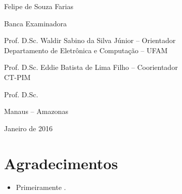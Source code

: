 





\begin{center}
{\large Felipe de Souza Farias}

\vspace*{3cm}

\tittese

\vspace*{1cm}


\vspace*{1cm}

Banca Examinadora
\vspace{2em}

Prof. D.Sc. Waldir Sabino da Silva Júnior -- Orientador\\
Departamento de Eletrônica e Computação -- UFAM
\vspace{2em}

Prof. D.Sc. Eddie Batista de Lima Filho -- Coorientador\\
CT-PIM
\vspace{2em}

Prof. D.Sc.  \\

\vspace{2em}


Manaus -- Amazonas

Janeiro de 2016

\end{center}

\thispagestyle{empty}


  \chapter*{Agradecimentos}
\begin{itemize}
  \item Primeiramente .


\end{itemize}


